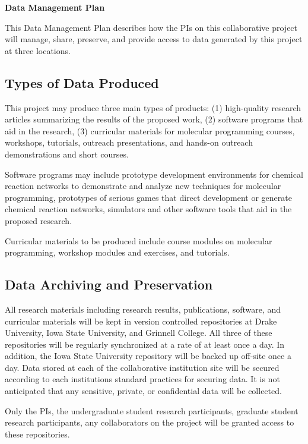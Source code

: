 \documentclass[11pt]{article}
\begin{document}
    \setcounter{page}{1}
    \begin{center}
        {\Large {\bf Data Management Plan}}
    \end{center}

    This Data Management Plan describes how the PIs on this collaborative project will manage, share, preserve, and provide access to data generated by this project at three locations.

    \subsection*{Types of Data Produced}
    This project may produce three main types of products:
    (1) high-quality research articles summarizing the results of the proposed work,
    (2) software programs that aid in the research,
    (3) curricular materials for molecular programming courses, workshops, tutorials, outreach presentations, and hands-on outreach demonstrations and short courses.
    
    Software programs may include prototype development environments for chemical reaction networks to demonstrate and analyze new techniques for molecular programming, prototypes of serious games that direct development or generate chemical reaction networks, simulators and other software tools that aid in the proposed research.
    
    Curricular materials to be produced include course modules on molecular programming, workshop modules and exercises, and tutorials.  
    
    \subsection*{Data Archiving and Preservation}
    All research materials including research results, publications, software, and curricular materials will be kept in version controlled repositories at Drake University, Iowa State University, and Grinnell College.
    All three of these repositories will be regularly synchronized at a rate of at least once a day.
    In addition,  the Iowa State University repository will be backed up off-site once a day.
    Data stored at each of the collaborative institution site will be secured according to each institutions standard practices for securing data.
    It is not anticipated that any sensitive, private, or confidential data will be collected.
    
    Only the PIs, the undergraduate student research participants, graduate student research participants, any collaborators on the project will be granted access to these repositories.
    
\end{document}
